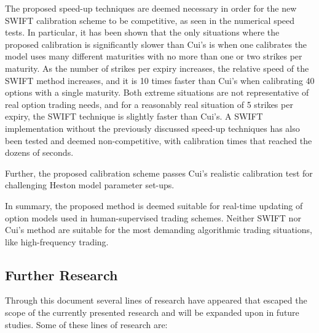 \documentclass[12,twoside]{mammeTFM}
\theoremstyle{definition}
\theoremstyle{remark}
\begin{document}
The proposed speed-up techniques are deemed necessary in order for the new SWIFT calibration scheme to be competitive, as seen in the numerical speed tests. In particular, it has been shown that the only situations where the proposed calibration is significantly slower than Cui's is when one calibrates the model uses many different maturities with no more than one or two strikes per maturity. As the number of strikes per expiry increases, the relative speed of the SWIFT method increases, and it is 10 times faster than Cui's when calibrating 40 options with a single maturity. Both extreme situations are not representative of real option trading needs, and for a reasonably real situation of 5 strikes per expiry, the SWIFT technique is slightly faster than Cui's. A SWIFT implementation without the previously discussed speed-up techniques has also been tested and deemed non-competitive, with calibration times that reached the dozens of seconds.

Further, the proposed calibration scheme passes Cui's realistic calibration test for challenging Heston model parameter set-ups.

In summary, the proposed method is deemed suitable for real-time updating of option models used in human-supervised trading schemes. Neither SWIFT nor Cui's method are suitable for the most demanding algorithmic trading situations, like high-frequency trading.

\subsection{Further Research}
Through this document several lines of research have appeared that escaped the scope of the currently presented research and will be expanded upon in future studies. Some of these lines of research are:
\end{document}
